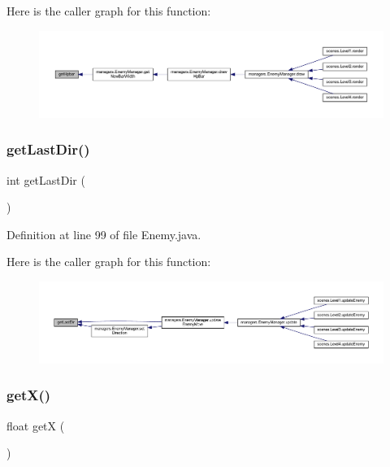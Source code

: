 Here is the caller graph for this function\+:
\nopagebreak
\begin{figure}[H]
\begin{center}
\leavevmode
\includegraphics[width=350pt]{classenemies_1_1_enemy_a719baea5da89286e1c263e1beb3ee35d_icgraph}
\end{center}
\end{figure}
\mbox{\label{classenemies_1_1_enemy_a1927b6b5c678c91bde7bfe83531c9a2d}} 
\subsubsection{\texorpdfstring{get\+Last\+Dir()}{getLastDir()}}
{\footnotesize\ttfamily int get\+Last\+Dir (\begin{DoxyParamCaption}{ }\end{DoxyParamCaption})}



Definition at line 99 of file Enemy.\+java.

Here is the caller graph for this function\+:
\nopagebreak
\begin{figure}[H]
\begin{center}
\leavevmode
\includegraphics[width=350pt]{classenemies_1_1_enemy_a1927b6b5c678c91bde7bfe83531c9a2d_icgraph}
\end{center}
\end{figure}
\mbox{\label{classenemies_1_1_enemy_ae8f033a71b96920114aee202798dc7e9}} 
\subsubsection{\texorpdfstring{get\+X()}{getX()}}
{\footnotesize\ttfamily float getX (\begin{DoxyParamCaption}{ }\end{DoxyParamCaption})}



